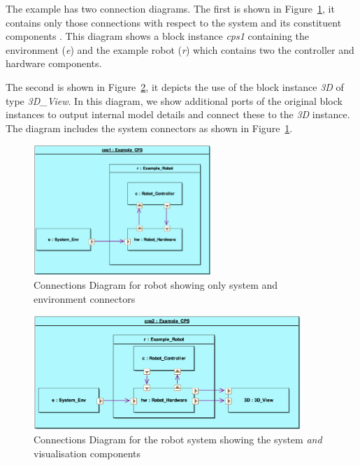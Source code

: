 The example has two connection diagrams. The first is shown in Figure~\ref{fig:example_cd}, it contains only those connections with respect to the system and its constituent components . This diagram shows a block instance \emph{cps1} containing the environment (\emph{e}) and the example robot (\emph{r}) which  contains two the controller and hardware components.

The second is shown in Figure~\ref{fig:example_cd2}, it depicts the use of the block instance \emph{3D} of type \emph{3D\_View}. In this diagram, we show additional ports of the original block instances to output internal model details and connect these to the \emph{3D} instance. The diagram includes the system connectors as shown in Figure~\ref{fig:example_cd}.

\begin{figure}
\centering
\includegraphics[width=0.6\textwidth]{figures/E_Blocks_ext_cd}
\caption{Connections Diagram for robot showing only system and environment connectors}
\label{fig:example_cd}
\end{figure}

\begin{figure}
\centering
\includegraphics[width=0.9\textwidth]{figures/E_Blocks_ext_cd2}
\caption{Connections Diagram for the robot system showing the system \textit{and} visualisation components}
\label{fig:example_cd2}
\end{figure}










